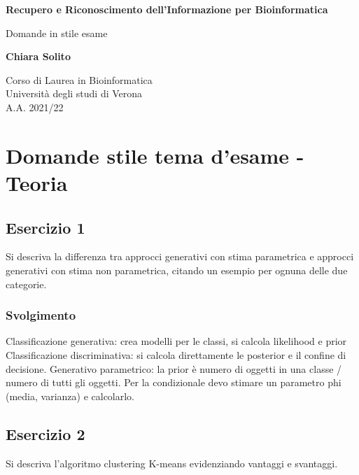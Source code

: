 \documentclass{article}
\begin{document}
\begin{titlepage}
    \begin{center}
        \vspace*{1cm}
            
        \Huge
        \textbf{Recupero e Riconoscimento dell'Informazione per Bioinformatica}
            
        \vspace{0.5cm}
        \LARGE
        Domande in stile esame
            
        \vspace{1.5cm}
            
        \textbf{Chiara Solito}

        \vspace{0.8cm}

            
        \Large
        Corso di Laurea in Bioinformatica\\
        Università degli studi di Verona\\
        A.A. 2021/22
            
    \end{center}
\end{titlepage}


\section*{Domande stile tema d'esame - Teoria}

\subsection*{Esercizio 1}
Si descriva la differenza tra approcci generativi con stima parametrica e
approcci generativi con stima non parametrica, citando un esempio per ognuna
delle due categorie.
\subsubsection*{Svolgimento}
Classificazione generativa: crea modelli per le classi, si calcola likelihood e prior
Classificazione discriminativa: si calcola direttamente le posterior e il confine di decisione.
Generativo parametrico: la prior è numero di oggetti in una classe / numero di tutti gli oggetti. Per la
condizionale devo stimare un parametro phi (media, varianza) e calcolarlo.

\subsection*{Esercizio 2}
Si descriva l'algoritmo clustering K-means evidenziando vantaggi e svantaggi.
\end{document}
